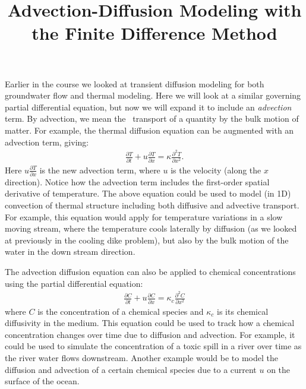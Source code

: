 \documentclass[11pt, oneside]{article}   	%
\date{}							%
\begin{document}
\title{\bf Advection-Diffusion Modeling with the Finite Difference Method }

\maketitle
 
Earlier in the course we looked at transient diffusion modeling for both groundwater flow and thermal  modeling.  Here we will look at a similar governing partial differential equation, but now we will expand it to  include an {\it advection} term. By advection, we mean the \ transport of a quantity by the bulk motion of matter. For example, the thermal diffusion equation can be augmented with an advection term, giving:
 \begin{eqnarray}
 	\frac{\partial T}{\partial t} + u  \frac{\partial T}{\partial x}  =   \kappa\frac{\partial^2 T}{\partial x^2} .
\end{eqnarray}
Here $u  \frac{\partial T}{\partial x}$ is the new advection term, where $u$ is the velocity (along the $x$ direction). Notice how the advection term includes the first-order spatial derivative of temperature. The above equation could be used to model (in 1D) convection of thermal structure including both diffusive and advective transport. For example, this equation would apply for temperature variations in a slow moving stream, where the temperature cools laterally by diffusion (as we looked at previously in the cooling dike problem), but also by the bulk motion of the water in the down stream direction. 

The advection diffusion equation can also be applied to chemical concentrations using the partial differential equation:
 \begin{eqnarray}
 	\frac{\partial C}{\partial t} + u  \frac{\partial C}{\partial x}  =   \kappa_c\frac{\partial^2 C}{\partial x^2}  
\end{eqnarray}
where $C$ is the concentration of a chemical species and $ \kappa_c$ is its chemical diffusivity in the medium. This equation could be used to track how a chemical concentration changes over time due to diffusion and advection. For example, it could be used to simulate the concentration of a  toxic spill in a river  over time as the river water flows downstream. Another example would be to model the diffusion and advection of a certain chemical species due to a current $u$ on the surface of the ocean.
\end{document}
